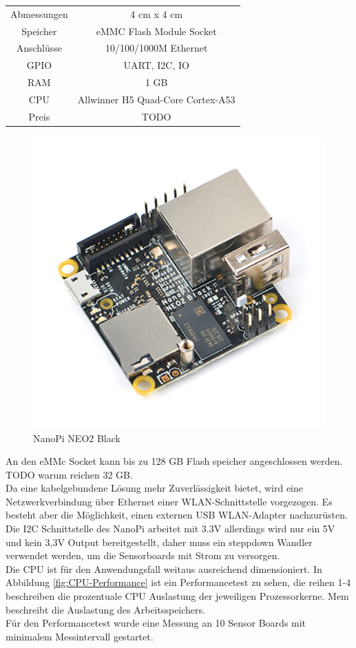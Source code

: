 \begin{center}
\begin{tabular}{ c c }
 Abmessungen & 4 cm x 4 cm \\ 
 Speicher & eMMC Flash Module Socket \\  
 Anschlüsse & 10/100/1000M Ethernet \\  
 GPIO & UART, I2C, IO \\  
 RAM & 1 GB \\  
 CPU & Allwinner H5 Quad-Core Cortex-A53 \\  
 Preis & TODO     
\end{tabular}
\end{center}
\begin{figure}[H]
  \centering
 \includegraphics[width=0.5\linewidth]{img/NanoPi_NEO2_Black.jpg}
  \caption{NanoPi NEO2 Black}
  \label{fig:NanoPi_NEO2_Black}
\end{figure}
An den eMMc Socket kann bis zu 128 GB Flash speicher angeschlossen werden.
TODO warum reichen 32 GB.\\
Da eine kabelgebundene Lösung mehr Zuverlässigkeit bietet, wird eine Netzwerkverbindung über Ethernet einer WLAN-Schnittstelle vorgezogen. Es besteht aber die Möglichkeit, einen externen USB WLAN-Adapter nachzurüsten.\\
Die I2C Schnittstelle des NanoPi arbeitet mit 3.3V allerdings wird nur ein 5V und kein 3,3V Output bereitgestellt, daher muss ein steppdown Wandler verwendet werden, um die Sensorboards mit Strom zu versorgen.\\
Die CPU ist für den Anwendungsfall weitaus ausreichend dimensioniert.
In Abbildung \ref{fig:CPU-Performance} ist ein Performancetest zu sehen, die reihen 1-4 beschreiben die prozentuale CPU Auslastung der jeweiligen Prozessorkerne.
Mem beschreibt die Auslastung des Arbeitsspeichers.\\
Für den Performancetest wurde eine Messung an 10 Sensor Boards mit minimalem Messintervall gestartet.
